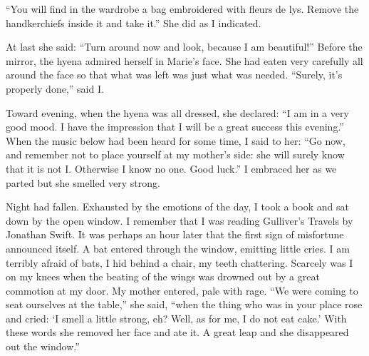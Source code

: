 \documentclass[10pt,a4paper]{article}
\begin{document}
“You will find in the wardrobe a bag embroidered with fleurs de lys. Remove the handkerchiefs inside it and take it.” She did as I indicated.

At last she said: “Turn around now and look, because I am beautiful!” Before the mirror, the hyena admired herself in Marie’s face. She had eaten very carefully all around the face so that what was left was just what was needed. “Surely, it’s properly done,” said I.

Toward evening, when the hyena was all dressed, she declared: “I am in a very good mood. I have the impression that I will be a great success this evening.” When the music below had been heard for some time, I said to her: “Go now, and remember not to place yourself at my mother’s side: she will surely know that it is not I. Otherwise I know no one. Good luck.” I embraced her as we parted but she smelled very strong.

Night had fallen. Exhausted by the emotions of the day, I took a book and sat down by the open window. I remember that I was reading Gulliver’s Travels by Jonathan Swift. It was perhaps an hour later that the first sign of misfortune announced itself. A bat entered through the window, emitting little cries. I am terribly afraid of bats, I hid behind a chair, my teeth chattering. Scarcely was I on my knees when the beating of the wings was drowned out by a great commotion at my door. My mother entered, pale with rage. “We were coming to seat ourselves at the table,” she said, “when the thing who was in your place rose and cried: ‘I smell a little strong, eh? Well, as for me, I do not eat cake.’ With these words she removed her face and ate it. A great leap and she disappeared out the window.”
\end{document}
